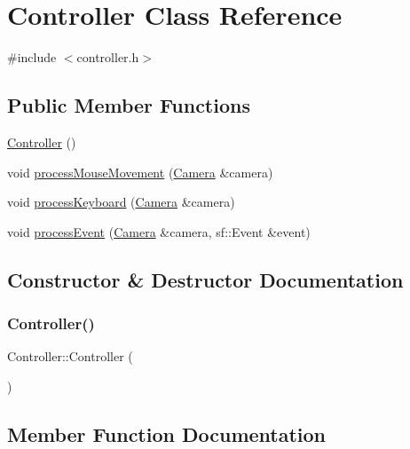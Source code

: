 \hypertarget{classController}{}\section{Controller Class Reference}
\label{classController}


{\ttfamily \#include $<$controller.\+h$>$}

\subsection*{Public Member Functions}
\begin{DoxyCompactItemize}
\item 
\hyperlink{classController_a95c56822d667e94b031451729ce069a9}{Controller} ()
\item 
void \hyperlink{classController_af1e42e9504275c0b2d6021495fce1f7c}{process\+Mouse\+Movement} (\hyperlink{classCamera}{Camera} \&camera)
\item 
void \hyperlink{classController_a2eedf6f8321610d8701b041d726f389d}{process\+Keyboard} (\hyperlink{classCamera}{Camera} \&camera)
\item 
void \hyperlink{classController_a0258c89a65d0d7ac3269ff9c154d9476}{process\+Event} (\hyperlink{classCamera}{Camera} \&camera, sf\+::\+Event \&event)
\end{DoxyCompactItemize}


\subsection{Constructor \& Destructor Documentation}
\mbox{\label{classController_a95c56822d667e94b031451729ce069a9}} 
\subsubsection{\texorpdfstring{Controller()}{Controller()}}
{\footnotesize\ttfamily Controller\+::\+Controller (\begin{DoxyParamCaption}{ }\end{DoxyParamCaption})}



\subsection{Member Function Documentation}
\mbox{\label{classController_a0258c89a65d0d7ac3269ff9c154d9476}} 
